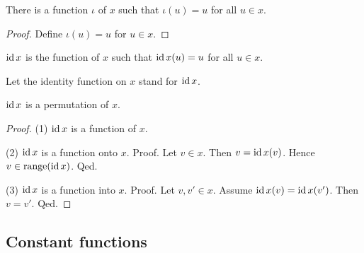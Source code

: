 \documentclass[../../sets-and-functions.ftl.tex]{subfiles}
\begin{document}
  \begin{forthel}
    \begin{lemma}
      There is a function $\iota$ of $x$ such that $\iota(u) = u$ for all $u \in x$.
    \end{lemma}
    \begin{proof}
      Define $\iota(u) = u$ for $u \in x$.
    \end{proof}

    \begin{definition}
      $\operatorname{id}{x}$ is the function of $x$ such that $\operatorname{id}{x}(u) = u$ for all $u \in x$.
    \end{definition}

    Let the identity function on $x$ stand for $\operatorname{id}{x}$.

    \begin{proposition}[SF 02 01 848243]
      $\operatorname{id}{x}$ is a permutation of $x$.
    \end{proposition}
    \begin{proof}
      (1) $\operatorname{id}{x}$ is a function of $x$.

      (2) $\operatorname{id}{x}$ is a function onto $x$.
      Proof.
        Let $v \in x$.
        Then $v = \operatorname{id}{x}(v)$.
        Hence $v \in \operatorname{range}(\operatorname{id}{x})$.
      Qed.

      (3) $\operatorname{id}{x}$ is a function into $x$.
      Proof.
        Let $v,v' \in x$.
        Assume $\operatorname{id}{x}(v) = \operatorname{id}{x}(v')$.
        Then $v = v'$.
      Qed.
    \end{proof}
  \end{forthel}


  \subsection{Constant functions}
\end{document}
